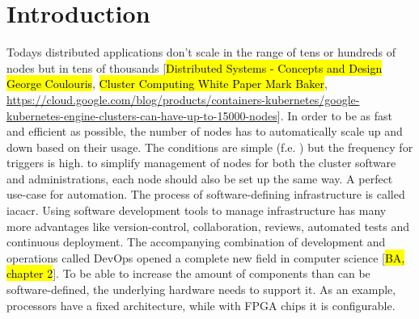 

\chapter{Introduction}






Todays distributed applications don't scale in the range of tens or hundreds of nodes but in tens of thousands [\hl{Distributed Systems - Concepts and Design George Coulouris}, \hl{Cluster Computing White Paper Mark Baker}, \url{https://cloud.google.com/blog/products/containers-kubernetes/google-kubernetes-engine-clusters-can-have-up-to-15000-nodes}]. In order to be as fast and efficient as possible, the number of nodes has to automatically scale up and down based on their usage. The conditions are simple (f.e. ) but the frequency for triggers is high. to simplify management of nodes for both the cluster software and administrations, each node should also be set up the same way. A perfect use-case for automation.
\newline
The process of software-defining infrastructure is called \gls{iacacr}. Using software development tools to manage infrastructure has many more advantages like version-control, collaboration, reviews, automated tests and continuous deployment. The accompanying combination of development and operations called DevOps opened a complete new field in computer science [\hl{BA, chapter 2}]. To be able to increase the amount of components than can be software-defined, the underlying hardware needs to support it. As an example, processors have a fixed architecture, while with FPGA chips it is configurable.

